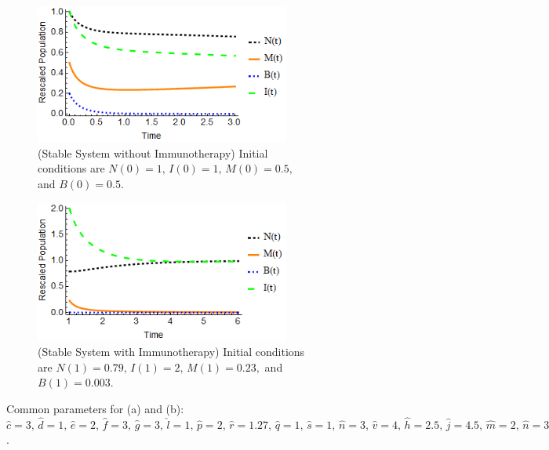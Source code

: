 \documentclass[letter,10pt]{article}
\begin{document}
\begin{figure}
\centering
\begin{subfigure}{.45\textwidth}
  \centering
  \includegraphics[width=3.3in]{2a.png}
  \caption{(Stable System without Immunotherapy) Initial conditions are $N(0)=1, \, I(0)=1, \, M(0)=0.5,$ and $B(0)=0.5$.}
  \label{HI1}
\end{subfigure}%
\hfill
\begin{subfigure}{.45\textwidth}
  \centering
  \includegraphics[width=3.3in]{2b.png}
  \caption{(Stable System with Immunotherapy) Initial conditions are $N(1)=0.79, \, I(1)=2, \, M(1)=0.23,$ and $B(1)=0.003$.}
  \label{HI2}
\end{subfigure}
\caption{Common parameters for (a) and (b):  $\hat{c}=3, \, \hat{d}=1, \, \hat{e}=2, \, \hat{f}=3, \, \hat{g}=3, \, \hat{l}=1, \, \hat{p}=2, \, \hat{r}=1.27, \, \hat{q}=1, \, \hat{s}=1, \, \hat{n}=3, \, \hat{v}=4, \, \hat{h}=2.5, \, \hat{j}=4.5, \, \hat{m}=2, \, \hat{n}=3, \, \hat{w}=1, \, \hat{u}=3$.}
\end{figure}




%
%
%
\end{document}
